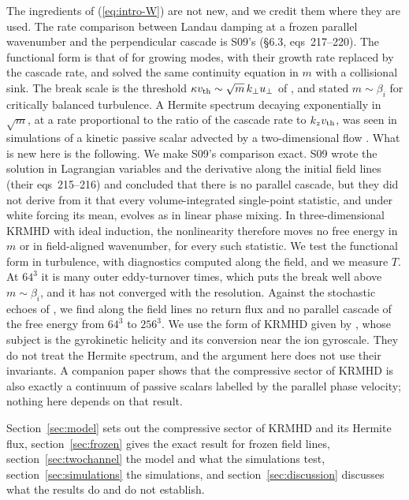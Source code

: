 The ingredients of (\ref{eq:intro-W}) are not new, and we credit them where they are used. The rate comparison between Landau damping at a frozen parallel wavenumber and the perpendicular cascade is S09's (\S6.3, eqs~217--220). The functional form is that of \citet[eq.~112]{ZoccoSchekochihin2011} for growing modes, with their growth rate replaced by the cascade rate, and \citet[eqs~2.58--2.59]{Schekochihin2016} solved the same continuity equation in $m$ with a collisional sink. The break scale is the threshold $\kappa v_{\mathrm{th}}\sim\sqrt m\,k_\perp u_\perp$ of \citet[eq.~4.5]{Schekochihin2016}, and \citet{Kawazura2019} stated $m\sim\beta_i$ for critically balanced turbulence. A Hermite spectrum decaying exponentially in $\sqrt m$, at a rate proportional to the ratio of the cascade rate to $k_zv_{\mathrm{th}}$, was seen in simulations of a kinetic passive scalar advected by a two-dimensional flow \citep[chapter~4]{KanekarThesis2015}. What is new here is the following. We make S09's comparison exact. S09 wrote the solution in Lagrangian variables and the derivative along the initial field lines (their eqs~215--216) and concluded that there is no parallel cascade, but they did not derive from it that every volume-integrated single-point statistic, and under white forcing its mean, evolves as in linear phase mixing. In three-dimensional KRMHD with ideal induction, the nonlinearity therefore moves no free energy in $m$ or in field-aligned wavenumber, for every such statistic. We test the functional form in turbulence, with diagnostics computed along the field, and we measure $T$. At $64^3$ it is many outer eddy-turnover times, which puts the break well above $m\sim\beta_i$, and it has not converged with the resolution. Against the stochastic echoes of \citet{Meyrand2019}, we find along the field lines no return flux and no parallel cascade of the free energy from $64^3$ to $256^3$. We use the form of KRMHD given by \citet{Chandran2026}, whose subject is the gyrokinetic helicity and its conversion near the ion gyroscale. They do not treat the Hermite spectrum, and the argument here does not use their invariants. A companion paper \citep{KanekarSlices} shows that the compressive sector of KRMHD is also exactly a continuum of passive scalars labelled by the parallel phase velocity; nothing here depends on that result.

Section~\ref{sec:model} sets out the compressive sector of KRMHD and its Hermite flux, section~\ref{sec:frozen} gives the exact result for frozen field lines, section~\ref{sec:twochannel} the model and what the simulations test, section~\ref{sec:simulations} the simulations, and section~\ref{sec:discussion} discusses what the results do and do not establish.
